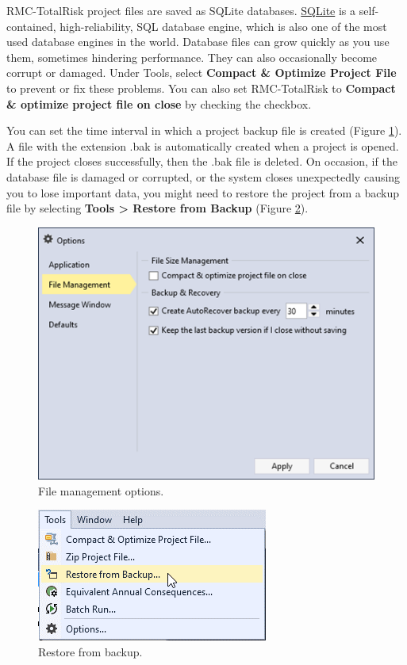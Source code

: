 \documentclass[
]{book}
\begin{document}
RMC-TotalRisk project files are saved as SQLite databases. \href{https://www.sqlite.org/}{SQLite} is a self-contained, high-reliability, SQL database engine, which is also one of the most used database engines in the world. Database files can grow quickly as you use them, sometimes hindering performance. They can also occasionally become corrupt or damaged. Under Tools, select \textbf{Compact \& Optimize Project File} to prevent or fix these problems. You can also set RMC-TotalRisk to \textbf{Compact \& optimize project file on close} by checking the checkbox.

You can set the time interval in which a project backup file is created (Figure \ref{fig:figure-34}). A file with the extension .bak is automatically created when a project is opened. If the project closes successfully, then the .bak file is deleted. On occasion, if the database file is damaged or corrupted, or the system closes unexpectedly causing you to lose important data, you might need to restore the project from a backup file by selecting \textbf{Tools \textgreater{} Restore from Backup} (Figure \ref{fig:figure-35}).

\begin{figure}

{\centering \includegraphics{images/figure34} 

}

\caption{File management options.}\label{fig:figure-34}
\end{figure}

\begin{figure}

{\centering \includegraphics{images/figure35} 

}

\caption{Restore from backup.}\label{fig:figure-35}
\end{figure}
\end{document}

